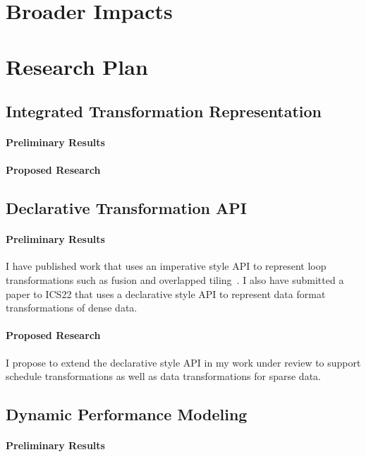 \documentclass{article}
\begin{document}
\section{Broader Impacts}



\section{Research Plan}

\subsection{Integrated Transformation Representation}

\paragraph{Preliminary Results}

\paragraph{Proposed Research}


\subsection{Declarative Transformation API}

\paragraph{Preliminary Results}
I have published work that uses an imperative style API to represent loop transformations such as fusion and overlapped tiling~\cite{neth2021inter}.
I also have submitted a paper to ICS22 that uses a declarative style API to represent data format transformations of dense data.
\paragraph{Proposed Research}
I propose to extend the declarative style API in my work under review to support schedule transformations as well as data transformations for sparse data.


\subsection{Dynamic Performance Modeling}

\paragraph{Preliminary Results}
\end{document}
